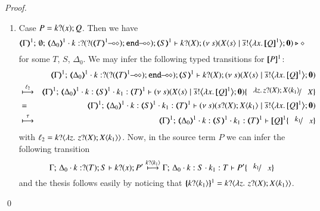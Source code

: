 \begin{proof}
\begin{enumerate}[1.]
\item Case $P = k ? (x) ; Q$.
Then we have
$$
\mapt{\Gamma}^{1};\, \emptyset;\, \mapt{\Delta_0}^{1} \cat 
k: \btinp{\lhot{\btinp{\lhot{\tmap{T}{1}}}\tinact}} \tmap{S}{1}
\proves
 \binp{k}{X} \newsp{s}{\appl{X}{s} \Par \bbout{\dual{s}}{\abs{x}{\pmap{Q}{1}}} \inact}
 \hastype \Proc
 $$
for some $T$, $S$, $\Delta_0$.
We may infer the following typed transitions for $[\!\![P]\!\!]^1$:
\begin{eqnarray*}
& & 
\mapt{\Gamma}^{1};\, %
\mapt{\Delta_0}^{1} \cat 
k: \btinp{\lhot{\btinp{\lhot{\tmap{T}{1}}}\tinact}} \tmap{S}{1}
\proves
 \binp{k}{X} \newsp{s}{\appl{X}{s} \Par \bbout{\dual{s}}{\abs{x}{\pmap{Q}{1}}} \inact} \\
 & \hby{\ell_2} & 
\mapt{\Gamma}^{1};\, %
\mapt{\Delta_0}^{1} \cat 
k:\tmap{S}{1}
\cat k_1:\tmap{T}{1}
\proves
  \newsp{s}{\appl{X}{s} \Par \bbout{\dual{s}}{\abs{x}{\pmap{Q}{1}}} \inact} \subst{\abs{z}\binp{z}{X}\appl{X}{k_1}}{X} \\
 & = & 
\mapt{\Gamma}^{1};\, %
\mapt{\Delta_0}^{1} 
\cat k:\tmap{S}{1}
\cat k_1:\tmap{T}{1}
\proves
  \newsp{s}{\binp{s}{X}\appl{X}{k_1} \Par \bbout{\dual{s}}{\abs{x}{\pmap{Q}{1}}} \inact}  \\
 & \hby{\tau} & 
\mapt{\Gamma}^{1};\, %
\mapt{\Delta_0}^{1} 
\cat k:\tmap{S}{1}
\cat k_1:\tmap{T}{1}
\proves
 \pmap{Q}{1}\subst{k_1}{x}   
  \end{eqnarray*} 
with $\ell_2 = k ? \langle \lambda z.\,\,z ? (X) ; X\langle k_1 \rangle \rangle$.
Now, in the source term $P$ we can infer the following transition 
$$
\Gamma;\,  \Delta_0 \cat k:\btinp{T} S \proves \binp{k}{x} P'
 \hby{\bactinp{k}{k_1}} 
 \Gamma;\,  \Delta_0 \cat k: S \cat k_1: T \proves P'\subst{k_1}{x}
$$
and the thesis follows easily by noticing that 
$\{\!\!\{k ? \langle k_1 \rangle\}\!\!\}^{1} = k ? \langle \lambda z.\,\,z ? (X) ; X\langle k_1 \rangle \rangle$.

\end{enumerate}
\qed
\end{proof}

%

